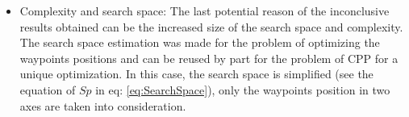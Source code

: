 \begin{itemize}
\begin{tabular}{l|p{1.3cm}p{1.3cm}p{1.3cm}p{1.3cm}p{1.3cm}p{1.3cm}}
\cellcolor[HTML]{F2F2FF}{$\sum_{i=1}^{n}B^{(k,p)}(G') + \frac{\sum_{i=1}^{n}B^{(k,p)}(G')}{(\frac{Distance}{n})\times 0.1}$}  &  \cellcolor[HTML]{F2F2FF}{57.78\%  426px}       & \cellcolor[HTML]{F2F2FF}{ 58.33\%  638px} & \cellcolor[HTML]{F2F2FF}{61.84\%   845px}& \cellcolor[HTML]{F2F2FF}{ 70.96\%  962px}& \cellcolor[HTML]{F2F2FF}{ 69.64\%  1099px}& \cellcolor[HTML]{F2F2FF}{ 82.50\%  1318px}\\ \hline
\end{tabular}
		\item Complexity and search space: 
		The last potential reason of the inconclusive results obtained can be the increased size of the search space and complexity. %
		The search space estimation was made for the problem of optimizing the waypoints positions and can be reused by part for the problem of CPP for a unique optimization. In this case, the  search space is simplified (see the equation  of $Sp$ in eq: \ref{eq:SearchSpace}), only  the waypoints position in two axes are taken into consideration. %

\end{itemize}

